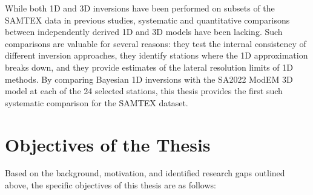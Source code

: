 While both 1D and 3D inversions have been performed on subsets of the SAMTEX data in previous studies, systematic and quantitative comparisons between independently derived 1D and 3D models have been lacking. Such comparisons are valuable for several reasons: they test the internal consistency of different inversion approaches, they identify stations where the 1D approximation breaks down, and they provide estimates of the lateral resolution limits of 1D methods. By comparing Bayesian 1D inversions with the SA2022 ModEM 3D model at each of the 24 selected stations, this thesis provides the first such systematic comparison for the SAMTEX dataset.


\section*{Objectives of the Thesis}

Based on the background, motivation, and identified research gaps outlined above, the specific objectives of this thesis are as follows:


